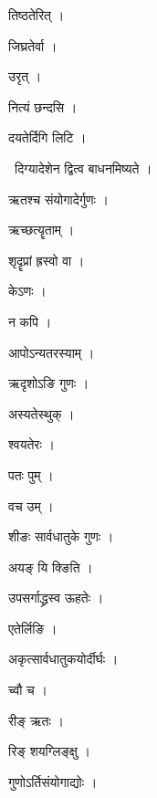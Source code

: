 \documentclass[10pt, openany, oneside]{book}
\begin{document}
\noindent तिष्ठतेरित् ।

\noindent जिघ्रतेर्वा ।

\noindent उरृत् ।

\noindent नित्यं छन्दसि ।

\noindent दयतेर्दिगि लिटि ।

\par\noindent\hspace{1.5em}{\vps वा॰}~{\qt दिग्यादेशेन द्वित्व बाधनमिष्यते ।}

\noindent ऋतश्च संयोगादेर्गुणः ।

\noindent ऋच्छत्यॄताम् ।

\noindent श‍ृदॄप्रां ह्रस्वो वा ।

\noindent केऽणः ।

\noindent न कपि ।

\noindent आपोऽन्यतरस्याम् ।

\noindent ऋदृशोऽङि गुणः ।

\noindent अस्यतेस्थुक् ।

\noindent श्वयतेरः ।

\noindent पतः पुम् ।

\noindent वच उम् ।

\noindent शीङः सार्वधातुके गुणः ।

\noindent अयङ् यि क्ङिति ।

\noindent उपसर्गाद्ध्रस्व ऊहतेः ।

\noindent एतेर्लिङि ।

\noindent अकृत्सार्वधातुकयोर्दीर्घः ।

\noindent च्वौ च ।

\noindent रीङ् ऋतः ।

\noindent रिङ् शयग्लिङ्क्षु ।

\noindent गुणोऽर्तिसंयोगाद्योः ।
\end{document}
